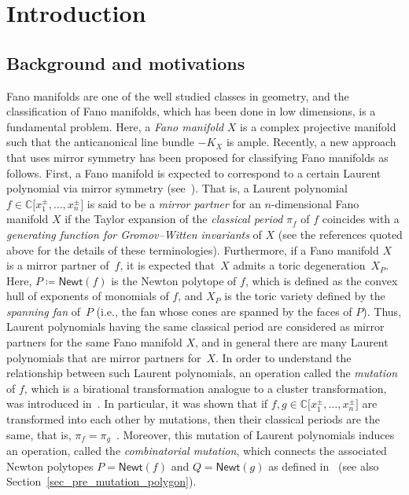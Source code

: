 \documentclass[pdftex]{sigma}%
\numberwithin{equation}{section}
\numberwithin{figure}{section}
\numberwithin{table}{section}
\newcommand{\CC}{\mathbb{C}}
\newcommand{\Newt}{\mathsf{Newt}}
\begin{document}
\tableofcontents

\section{Introduction}\label{sec_intro}

\subsection{Background and motivations}
Fano manifolds are one of the well studied classes in geometry, and the classification of Fano manifolds, which has been done in low dimensions, is a fundamental problem. Here, a \emph{Fano manifold} $X$ is a complex projective manifold such that the anticanonical line bundle $-K_X$ is ample.
Recently, a new approach that uses mirror symmetry has been proposed for classifying Fano manifolds as follows.
First, a Fano manifold is expected to correspond to a certain Laurent polynomial via mirror symmetry (see~\cite{CCGGK}).
That is, a Laurent polynomial $f\in\CC\big[x_1^\pm,\dots,x_n^\pm\big]$ is said to be a \emph{mirror partner} for an $n$-dimensional Fano manifold $X$
if the Taylor expansion of the \emph{classical period} $\pi_f$ of $f$ coincides with a \emph{generating function for Gromov--Witten invariants} of $X$
(see the references quoted above for the details of these terminologies).
Furthermore, if a Fano manifold $X$ is a mirror partner of~$f$, it is expected that~$X$ admits a toric degeneration~$X_P$.
Here, $P\coloneqq \Newt(f)$ is the Newton polytope of $f$, which is defined as the convex hull of exponents of monomials of $f$, and $X_P$ is the toric variety defined by the \emph{spanning fan} of~$P$ (i.e., the fan whose cones are spanned by the faces of $P$).
Thus, Laurent polynomials having the same classical period are considered as mirror partners for the same Fano manifold $X$, and in general there are many Laurent polynomials that are mirror partners for~$X$.
In order to understand the relationship between such Laurent polynomials, an operation called the \emph{mutation} of $f$, which is a birational transformation analogue to a cluster transformation, was introduced in~\cite{GU}.
In particular, it was shown that if $f, g\in\CC\big[x_1^\pm,\dots,x_n^\pm\big]$ are transformed into each other by mutations,
then their classical periods are the same, that is, $\pi_f=\pi_g$~\cite[Lemma~1]{ACGK}.
Moreover, this mutation of Laurent polynomials induces an operation, called the \emph{combinatorial mutation}, which connects
the associated Newton polytopes $P=\Newt(f)$ and $Q=\Newt(g)$ as defined in~\cite{ACGK} (see also Section~\ref{sec_pre_mutation_polygon}).
\end{document}

